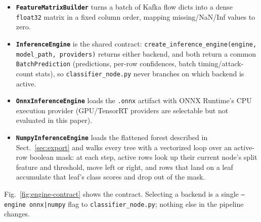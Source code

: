 \documentclass[runningheads]{llncs}
\begin{document}
\begin{itemize}
  \item \textbf{\texttt{FeatureMatrixBuilder}} turns a batch of Kafka flow dicts into a dense \texttt{float32} matrix in a fixed column order, mapping missing/NaN/Inf values to zero.
  \item \textbf{\texttt{InferenceEngine}} is the shared contract: \texttt{create\_inference\_engine(engine, model\_path, providers)} returns either backend, and both return a common \texttt{BatchPrediction} (predictions, per-row confidences, batch timing/attack-count stats), so \texttt{classifier\_node.py} never branches on which backend is active.
  \item \textbf{\texttt{OnnxInferenceEngine}} loads the \texttt{.onnx} artifact with ONNX Runtime's CPU execution provider (GPU/TensorRT providers are selectable but not evaluated in this paper).
  \item \textbf{\texttt{NumpyInferenceEngine}} loads the flattened forest described in Sect.~\ref{sec:export} and walks every tree with a vectorized loop over an active-row boolean mask: at each step, active rows look up their current node's split feature and threshold, move left or right, and rows that land on a leaf accumulate that leaf's class scores and drop out of the mask.
\end{itemize}

Fig.~\ref{fig:engine-contract} shows the contract. Selecting a backend is a single \texttt{--engine onnx|numpy} flag to \texttt{classifier\_node.py}; nothing else in the pipeline changes.
\end{document}
